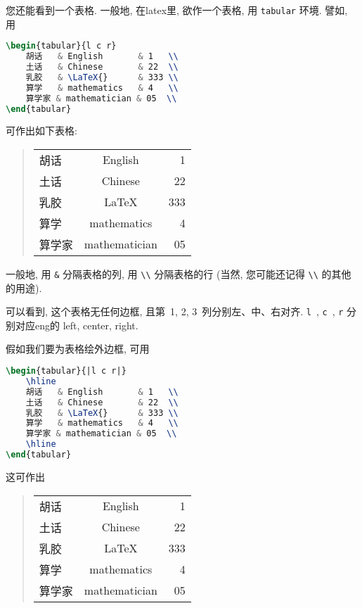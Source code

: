 您还能看到一个表格.
一般地, 在\gls{latex}里, 欲作一个表格,
用 \verb`tabular` 环境.
譬如, 用
\begin{lstlisting}[language=TeX]
\begin{tabular}{l c r}
    胡话   & English       & 1   \\
    土话   & Chinese       & 22  \\
    乳胶   & \LaTeX{}      & 333 \\
    算学   & mathematics   & 4   \\
    算学家 & mathematician & 05  \\
\end{tabular}
\end{lstlisting}
可作出如下表格:
\begin{quotation}
    \begin{tabular}{l c r}
        胡话  & English       & 1   \\
        土话  & Chinese       & 22  \\
        乳胶  & \LaTeX{}      & 333 \\
        算学  & mathematics   & 4   \\
        算学家 & mathematician & 05  \\
    \end{tabular}
\end{quotation}

一般地, 用 \verb`&` 分隔表格的列,
用 \verb`\\` 分隔表格的行
(当然, 您可能还记得 \verb`\\` 的其他的用途).

可以看到, 这个表格无任何边框,
且第~1, 2, 3~列分别左、中、右对齐.
\verb`l`~, \verb`c`~, \verb`r`
分别对应\gls{eng}的
left, center, right.

假如我们要为表格绘外边框, 可用
\begin{lstlisting}[language=TeX]
\begin{tabular}{|l c r|}
    \hline
    胡话   & English       & 1   \\
    土话   & Chinese       & 22  \\
    乳胶   & \LaTeX{}      & 333 \\
    算学   & mathematics   & 4   \\
    算学家 & mathematician & 05  \\
    \hline
\end{tabular}
\end{lstlisting}
这可作出
\begin{quotation}
    \begin{tabular}{|l c r|}
        \hline
        胡话  & English       & 1   \\
        土话  & Chinese       & 22  \\
        乳胶  & \LaTeX{}      & 333 \\
        算学  & mathematics   & 4   \\
        算学家 & mathematician & 05  \\
        \hline
    \end{tabular}
\end{quotation}

